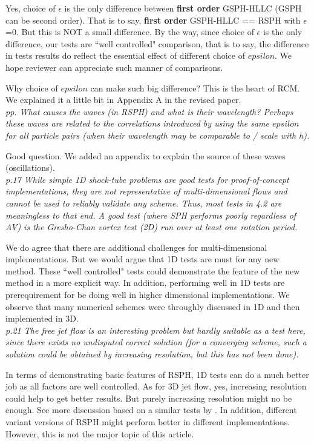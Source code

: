 \documentclass[10pt,a4paper]{article}
\begin{document}
Yes, choice of $\epsilon$ is the only difference between \textbf{first order} GSPH-HLLC (GSPH can be second order). That is to say, \textbf{first order} GSPH-HLLC == RSPH with $\epsilon$=0.
But this is NOT a small difference.
By the way, since choice of $\epsilon$ is the only difference, our tests are ``well controlled" comparison, that is to say, the difference in tests results do reflect the essential effect of different choice of $epsilon$. We hope reviewer can appreciate such manner of comparisons.

Why choice of $epsilon$ can make such big difference? This is the heart of RCM. We explained it a little bit in Appendix A in the revised paper. 
\\[3pt]

\textit{pp. What causes the waves (in RSPH) and what is their wavelength? Perhaps
these waves are related to the correlations introduced by using the same
$epsilon$ for all particle pairs (when their wavelength may be comparable
to / scale with h).}

Good question. We added an appendix to explain the source of these waves (oscillations).
\\[3pt]

\textit{p.17 While simple 1D shock-tube problems are good tests for proof-of-concept implementations, they are not representative of
multi-dimensional flows and cannot be used to reliably validate any scheme. Thus, most tests in 4.2 are meaningless to that end.
A good test (where SPH performs poorly regardless of AV) is the Gresho-Chan vortex test (2D) run over at least one rotation period.}

We do agree that there are additional challenges for multi-dimensional implementations. But we would argue that 1D tests are must for any new method. These ``well controlled" tests could demonstrate the feature of the new method in a more explicit way. In addition, performing well in 1D tests are prerequirement for be doing well in higher dimensional implementations. We observe that many numerical schemes were throughly discussed in 1D and then implemented in 3D.
\\[3pt]

\textit{p.21 The free jet flow is an interesting problem but hardly suitable as a
test here, since there exists no undisputed correct solution (for a converging scheme, such a solution could be obtained by increasing resolution, but this has not been done).}

In terms of demonstrating basic features of RSPH, 1D tests can do a much better job as all factors are well controlled. 
As for 3D jet flow, yes, increasing resolution could help to get better results. But purely increasing resolution might no be enough. See more discussion based on a similar tests by \citet{cha2010kelvin}. 
In addition, different variant versions of RSPH might perform better in different implementations. However, this is not the major topic of this article.
\\[3pt]
\end{document}
